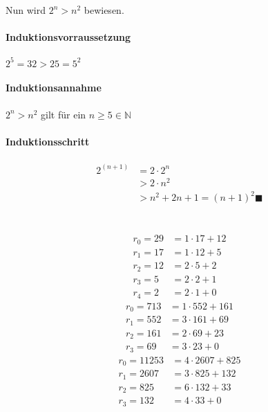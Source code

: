 \documentclass{article}
\begin{document}
            Nun wird $2^n>n^2$ bewiesen.
            \paragraph{Induktionsvorraussetzung}
                $2^5=32>25=5^2$
            \paragraph{Induktionsannahme}
                $2^n> n^2$ gilt für ein $n\geq 5 \in \mathbb N$
            \paragraph{Induktionsschritt}
                \begin{align*}
                    2^{(n+1)}&=2\cdot 2^n\\
                    &> 2 \cdot n^2\\
                    &> n^2 + 2n+1 = (n+1)^2 \blacksquare
                \end{align*}
    \section{}
    \section{}
    \section{}
    \begin{align*}
        r_0 = 29&= 1\cdot 17 + 12\\
        r_1 = 17&= 1\cdot 12 + 5\\
        r_2 = 12&= 2\cdot 5 + 2\\
        r_3 = 5&= 2\cdot 2 + 1\\
        r_4 = 2&= 2\cdot 1 + 0
    \end{align*}
    \begin{align*}
        r_0 = 713&= 1\cdot 552 + 161\\
        r_1 = 552&= 3\cdot 161 + 69\\
        r_2 = 161&= 2\cdot 69 + 23\\
        r_3 = 69&= 3\cdot 23 + 0
    \end{align*}
    \begin{align*}
        r_0 = 11253&= 4\cdot 2607 + 825\\
        r_1 = 2607&= 3\cdot 825 + 132\\
        r_2 = 825&= 6\cdot 132 + 33\\
        r_3 = 132&= 4\cdot 33 + 0
    \end{align*}
\end{document}
